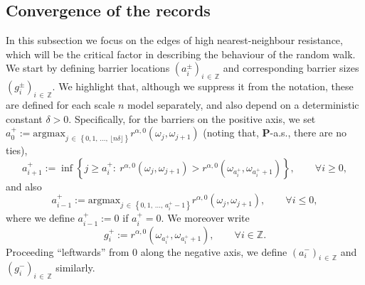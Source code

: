 \documentclass[AHL,Unicode,longabstracts,published]{cedram}
\newcommand{\Z}{\mathbb Z}
\newcommand{\bfP}{\mathbf{P}}
\newcommand{\argmax}{\mathrm{argmax}}
\let\oldforall\forall
\renewcommand*{\forall}{\mathrel{\oldforall}}
\begin{document}
\subsection{Convergence of the records}\label{21}
In this subsection we focus on the edges of high nearest-neighbour resistance, which will be the critical factor in describing the behaviour of the random walk. We start by defining barrier locations $(a_i^\pm)_{i\,\in\,\Z}$ and corresponding barrier sizes $(g_i^\pm)_{i\,\in\,\Z}$. We highlight that, although we suppress it from the notation, these are defined for each scale $n$ model separately, and also depend on a deterministic constant $\delta>0$. Specifically, for the barriers on the positive axis, we set $a_0^+:=\argmax_{j\,\in\,\left\{0,1,\,\dots,\,\lfloor n\delta\rfloor\right\}}r^{\alpha,0}(\omega_j,\omega_{j+1})$ (noting that, $\bfP$-a.s., there are no ties),
\begin{equation}\label{adef}
a_{i+1}^+:=\inf\left\{j\geq a_{i}^+:\:r^{\alpha,0}\left(\omega_j,\omega_{j+1}\right)>r^{\alpha,0}\left(\omega_{a_i^+},\omega_{a_{i}^++1}\right)\right\},\qquad \forall i\geq 0,
\end{equation}
and also
\[
a_{i-1}^+:=\argmax_{j\,\in\,\left\{0,1,\,\dots,\,a_{i}^+-1\right\}}r^{\alpha,0}\left(\omega_j,\omega_{j+1}\right),\qquad \forall i\leq 0,
\]
where we define $a_{i-1}^+:=0$ if $a_i^{+}=0$. We moreover write
\begin{equation}\label{gdef}
g_i^+:=r^{\alpha,0}\left(\omega_{a_i^+},\omega_{a_{i}^++1}\right),\qquad \forall i\in\Z.
\end{equation}
Proceeding ``leftwards'' from 0 along the negative axis, we define $(a_i^-)_{i\,\in\,\Z}$ and $(g_i^-)_{i\,\in\,\Z}$ similarly.
\end{document}

